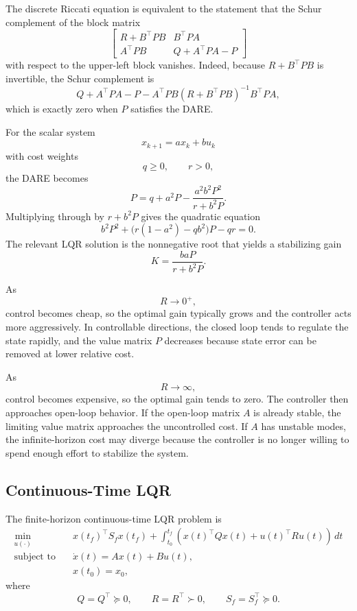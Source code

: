 \begin{remark}
	The discrete Riccati equation is equivalent to the statement that the Schur complement of the block matrix
	\[
		\begin{bmatrix}
			R+B^\top P B & B^\top P A \\
			A^\top P B & Q+A^\top P A-P
		\end{bmatrix}
	\]
	with respect to the upper-left block vanishes. Indeed, because $R+B^\top P B$ is invertible, the Schur complement is
	\[
		Q+A^\top P A-P
		-
		A^\top P B(R+B^\top P B)^{-1}B^\top P A,
	\]
	which is exactly zero when $P$ satisfies the DARE.
\end{remark}

\begin{eg}
	For the scalar system
	\[
		x_{k+1}=ax_k+bu_k
	\]
	with cost weights
	\[
		q \ge 0,
		\qquad
		r>0,
	\]
	the DARE becomes
	\[
		P=q+a^2P-\frac{a^2b^2P^2}{r+b^2P}.
	\]
	Multiplying through by $r+b^2P$ gives the quadratic equation
	\[
		b^2P^2 + \bigl(r(1-a^2)-qb^2\bigr)P - qr = 0.
	\]
	The relevant LQR solution is the nonnegative root that yields a stabilizing gain
	\[
		K=\frac{baP}{r+b^2P}.
	\]
\end{eg}

\begin{remark}
	As
	\[
		R \to 0^+,
	\]
	control becomes cheap, so the optimal gain typically grows and the controller acts more aggressively. In controllable directions, the closed loop tends to regulate the state rapidly, and the value matrix $P$ decreases because state error can be removed at lower relative cost.

	As
	\[
		R \to \infty,
	\]
	control becomes expensive, so the optimal gain tends to zero. The controller then approaches open-loop behavior. If the open-loop matrix $A$ is already stable, the limiting value matrix approaches the uncontrolled cost. If $A$ has unstable modes, the infinite-horizon cost may diverge because the controller is no longer willing to spend enough effort to stabilize the system.
\end{remark}

\subsection{Continuous-Time LQR}
\label{sec:l6-continuous-time-lqr}

\begin{definition}\label{def:l6-continuous-time-lqr}
	The finite-horizon continuous-time LQR problem is
	\begin{align*}
		\min_{u(\cdot)} \quad & x(t_f)^\top S_f x(t_f) + \int_{t_0}^{t_f}\left(x(t)^\top Q x(t) + u(t)^\top R u(t)\right)\,dt \\
		\text{subject to}\quad & \dot x(t)=Ax(t)+Bu(t), \\
		                       & x(t_0)=x_0,
	\end{align*}
	where
	\[
		Q=Q^\top \succeq 0,
		\qquad
		R=R^\top \succ 0,
		\qquad
		S_f=S_f^\top \succeq 0.
	\]
\end{definition}

